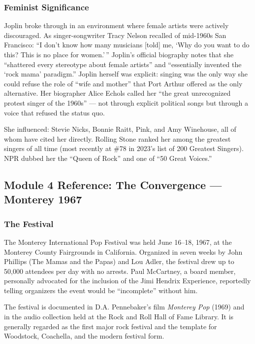 \documentclass[11pt,letterpaper]{article}
\begin{document}
\subsubsection{Feminist Significance}

Joplin broke through in an environment where female artists were actively discouraged. As singer-songwriter Tracy Nelson recalled of mid-1960s San Francisco: ``I don't know how many musicians [told] me, `Why do you want to do this? This is no place for women.'\,'' Joplin's official biography notes that she ``shattered every stereotype about female artists'' and ``essentially invented the `rock mama' paradigm.'' Joplin herself was explicit: singing was the only way she could refuse the role of ``wife and mother'' that Port Arthur offered as the only alternative. Her biographer Alice Echols called her ``the great unrecognized protest singer of the 1960s'' --- not through explicit political songs but through a voice that refused the status quo.

She influenced: Stevie Nicks, Bonnie Raitt, Pink, and Amy Winehouse, all of whom have cited her directly. Rolling Stone ranked her among the greatest singers of all time (most recently at \#78 in 2023's list of 200 Greatest Singers). NPR dubbed her the ``Queen of Rock'' and one of ``50 Great Voices.''

\subsection{Module 4 Reference: The Convergence --- Monterey 1967}

\subsubsection{The Festival}

The Monterey International Pop Festival was held June 16--18, 1967, at the Monterey County Fairgrounds in California. Organized in seven weeks by John Phillips (The Mamas and the Papas) and Lou Adler, the festival drew up to 50,000 attendees per day with no arrests. Paul McCartney, a board member, personally advocated for the inclusion of the Jimi Hendrix Experience, reportedly telling organizers the event would be ``incomplete'' without him.

The festival is documented in D.A. Pennebaker's film \textit{Monterey Pop} (1969) and in the audio collection held at the Rock and Roll Hall of Fame Library. It is generally regarded as the first major rock festival and the template for Woodstock, Coachella, and the modern festival form.
\end{document}
